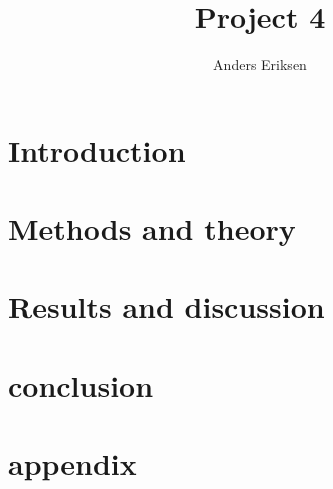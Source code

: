 \documentclass[10pt, twocolumn]{revtex4-1}
\begin{document}
\title{Project 4}
\author{Anders Eriksen}
\begin{abstract}
\end{abstract}
\maketitle

\section{Introduction}

\section{Methods and theory}

\section{Results and discussion}

\section{conclusion}

\section{appendix}



\end{document}

